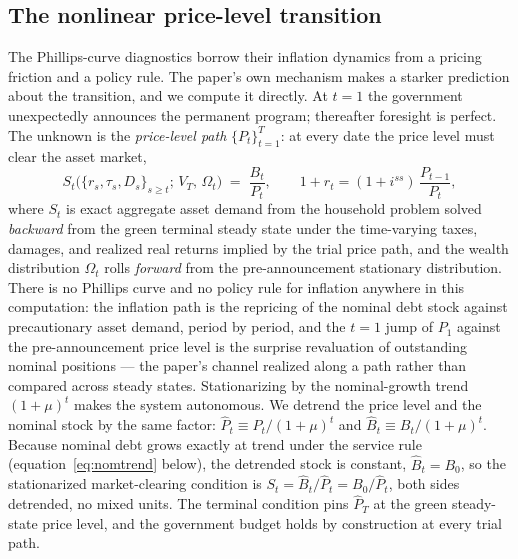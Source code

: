 \documentclass[12pt]{article}
\newcommand{\Sfun}{S}
\begin{document}
\subsection{The nonlinear price-level transition}\label{subsec:tier2}

The Phillips-curve diagnostics borrow their inflation dynamics from a
pricing friction and a policy rule. The paper's own mechanism makes a
starker prediction about the transition, and we compute it directly. At $t=1$ the government unexpectedly announces
the permanent program; thereafter foresight is perfect. The unknown is
the \emph{price-level path} $\{P_t\}_{t=1}^{T}$: at every date the price
level must clear the asset market,
\[
S_t\bigl(\{r_s, \tau_s, D_s\}_{s \ge t};\, V_T,\, \Omega_t\bigr)
\;=\; \frac{B_t}{P_t}, \qquad
1 + r_t = (1+i^{ss})\,\frac{P_{t-1}}{P_t},
\]
where $S_t$ is exact aggregate asset demand from the household problem
solved \emph{backward} from the green terminal steady state under the
time-varying taxes, damages, and realized real returns implied by the
trial price path, and the wealth distribution $\Omega_t$ rolls
\emph{forward} from the pre-announcement stationary distribution. There
is no Phillips curve and no policy rule for inflation anywhere in this
computation: the inflation path is the repricing of the nominal
debt stock against precautionary asset demand, period by period, and the
$t=1$ jump of $P_1$ against the pre-announcement price level is the
surprise revaluation of outstanding nominal positions --- the paper's
channel realized along a path rather than compared across steady states.
Stationarizing by the nominal-growth trend $(1+\mu)^t$ makes the system
autonomous. We detrend the price level and the nominal stock by the
same factor: $\hat P_t\equiv P_t/(1+\mu)^t$ and $\hat B_t\equiv
B_t/(1+\mu)^t$. Because nominal debt grows exactly at trend under the service
rule (equation~\eqref{eq:nomtrend} below), the detrended stock is
constant, $\hat B_t=B_0$, so the stationarized market-clearing condition
is $\Sfun_t=\hat B_t/\hat P_t=B_0/\hat P_t$, both sides detrended, no mixed
units. The terminal condition pins $\hat{P}_T$ at the green
steady-state price level, and the government budget holds by construction
at every trial path.
\end{document}

